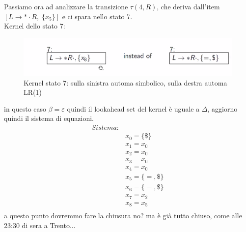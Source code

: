 \documentclass[class=book, crop=false, oneside, 12pt]{standalone}
\begin{document}
Passiamo ora ad analizzare la transizione \(\tau(4, R)\), che deriva dall'item \([L \to * \cdot R, \; \{x_5\}]\) e ci spara nello stato 7.
\\
Kernel dello stato 7:
\begin{figure}
    \centering
    \includegraphics[width=.7\textwidth]{ex_automa_simbolico-kernel_s7.png}
    \caption{Kernel stato 7: sulla sinistra automa simbolico, sulla destra automa LR(1)}
\end{figure}
in questo caso  \(\beta = \varepsilon\) quindi il lookahead set del kernel è uguale a \(\Delta\), aggiorno quindi il sistema di equazioni.
\begin{align*}
    Sistema:& \\
            & x_0 = \{\$\} \\
            & x_1 = x_0 \\
            & x_2 = x_0 \\
            & x_3 = x_0 \\
            & x_4 = x_0 \\
            & x_5 = \{=, \$\} \\
            & x_6 = \{=, \$\} \\
            & x_7 = x_2 \\
            & x_8 = x_5 \\
\end{align*}
a questo punto dovremmo fare la chiusura no? ma è già tutto chiuso, come alle 23:30 di sera a Trento...
\end{document}

